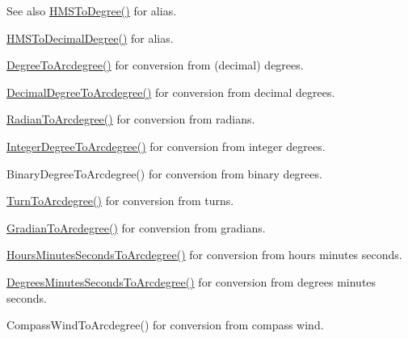 \begin{DoxySeeAlso}{See also}
\mbox{\hyperlink{group___e_g_x_math-_angle_conversions-_h_m_s_ga281ee88be0cb04f58bdf19efcef58146}{H\+M\+S\+To\+Degree()}} for alias. 

\mbox{\hyperlink{group___e_g_x_math-_angle_conversions-_h_m_s_gacc6ae7123e7e54ddf8538cd6ab0198ce}{H\+M\+S\+To\+Decimal\+Degree()}} for alias. 

\mbox{\hyperlink{group___e_g_x_math-_angle_conversions-_degree_gac1b5f3b68f66c77a6df4ceef842c9b19}{Degree\+To\+Arcdegree()}} for conversion from (decimal) degrees. 

\mbox{\hyperlink{group___e_g_x_math-_angle_conversions-_decimal_degree_gacdd463fcabffeb598ebda65b012ce743}{Decimal\+Degree\+To\+Arcdegree()}} for conversion from decimal degrees. 

\mbox{\hyperlink{group___e_g_x_math-_angle_conversions-_radian_ga3dfdc97357cc07f8379976bbc08f9852}{Radian\+To\+Arcdegree()}} for conversion from radians. 

\mbox{\hyperlink{group___e_g_x_math-_angle_conversions-_integer_degree_gaf633d0b82bfb7586ce86ffbcf78d8f7a}{Integer\+Degree\+To\+Arcdegree()}} for conversion from integer degrees. 

Binary\+Degree\+To\+Arcdegree() for conversion from binary degrees. 

\mbox{\hyperlink{group___e_g_x_math-_angle_conversions-_turn_ga7bdc3a81ce316dd47b1a3179489fa195}{Turn\+To\+Arcdegree()}} for conversion from turns. 

\mbox{\hyperlink{group___e_g_x_math-_angle_conversions-_gradian_gacd0b1797f2460944dcbc541a855ec21c}{Gradian\+To\+Arcdegree()}} for conversion from gradians. 

\mbox{\hyperlink{group___e_g_x_math-_angle_conversions-_hours_minutes_seconds_ga3c38143df47da88534ddbd13726748e2}{Hours\+Minutes\+Seconds\+To\+Arcdegree()}} for conversion from hours minutes seconds. 

\mbox{\hyperlink{group___e_g_x_math-_angle_conversions-_degrees_minutes_seconds_ga71fd0a3b9238a3a4fde150802938dee8}{Degrees\+Minutes\+Seconds\+To\+Arcdegree()}} for conversion from degrees minutes seconds. 

Compass\+Wind\+To\+Arcdegree() for conversion from compass wind. 
\end{DoxySeeAlso}
\mbox{\label{group___e_g_x_math-_angle_conversions-_h_m_s_ga36fcb6a59fd8d135346f7ee3d648c2f4}} 
